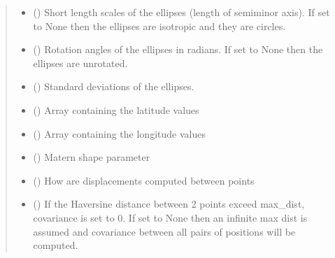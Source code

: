 \documentclass[letterpaper,10pt,english]{sphinxmanual}
\begin{document}
\begin{fulllineitems}
\begin{quote}
\begin{description}
\begin{itemize}
\item {}
\sphinxAtStartPar
{} () \textendash{} Short length scales of the ellipses (length of semi\sphinxhyphen{}minor axis). If set
to None then the ellipses are isotropic and they are circles.

\item {}
\sphinxAtStartPar
{} () \textendash{} Rotation angles of the ellipses in radians. If set to None then the
ellipses are unrotated.

\item {}
\sphinxAtStartPar
{} () \textendash{} Standard deviations of the ellipses.

\item {}
\sphinxAtStartPar
{} () \textendash{} Array containing the latitude values

\item {}
\sphinxAtStartPar
{} () \textendash{} Array containing the longitude values

\item {}
\sphinxAtStartPar
{} () \textendash{} Matern shape parameter

\item {}
\sphinxAtStartPar
{} () \textendash{} How are displacements computed between points

\item {}
\sphinxAtStartPar
{} () \textendash{} If the Haversine distance between 2 points exceed max\_dist,
covariance is set to 0. If set to None then an infinite max dist is
assumed and covariance between all pairs of positions will be computed.


\end{itemize}
\end{description}
\end{quote}
\end{fulllineitems}
\end{document}
